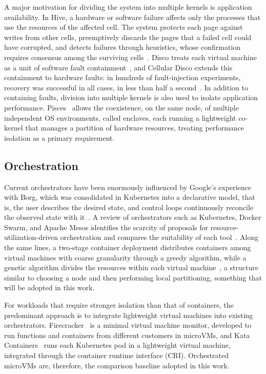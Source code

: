 \documentclass[12pt]{article}
\begin{document}
A major motivation for dividing the system into multiple kernels is application availability.
In Hive, a hardware or software failure affects only the processes that use the resources of the affected cell.
The system protects each page against writes from other cells, preemptively discards the pages that a failed cell
could have corrupted, and detects failures through heuristics, whose confirmation requires consensus among the surviving
cells~\cite{chapin1995hive}.
Disco treats each virtual machine as a unit of software fault
containment~\cite{bugnion1997disco}, and Cellular Disco extends this containment to hardware faults: in hundreds of
fault-injection experiments, recovery was successful in all cases, in less than half a
second~\cite{govil2000cellular}.
In addition to containing faults, division into multiple kernels is also used to isolate
application performance.
Pisces~\cite{ouyang2015pisces} allows the coexistence, on the same node, of multiple
independent OS environments, called enclaves, each running a lightweight co-kernel that manages a partition
of hardware resources, treating performance isolation as a primary requirement.

\subsection{Orchestration} \label{sec:rel-orquestracao}

Current orchestrators have been enormously influenced by Google's experience with Borg, which was
consolidated in Kubernetes into a declarative model, that is, the user describes the desired state, and control loops
continuously reconcile the observed state with it~\cite{burns2016borg}.
A review of orchestrators such as Kubernetes, Docker Swarm, and Apache Mesos identifies the scarcity of proposals for
resource-utilization-driven orchestration and compares the suitability of each tool~\cite{swetha2025resource}.
Along the same lines, a two-stage container deployment distributes containers among virtual machines with
coarse granularity through a greedy algorithm, while a genetic algorithm divides the resources within
each virtual machine~\cite{lu2025optimized}, a structure similar to choosing a node and then performing local partitioning,
something that will be adopted in this work.

For workloads that require stronger isolation than that of containers, the predominant approach is to integrate lightweight virtual
machines into existing orchestrators. Firecracker~\cite{agache2020firecracker} is a minimal virtual machine
monitor, developed to run functions and containers from different customers in microVMs, and
Kata Containers~\cite{katacontainers} runs each Kubernetes pod in a lightweight virtual machine, integrated
through the container runtime interface (CRI).
Orchestrated microVMs are, therefore, the comparison baseline adopted in this work.
\end{document}
